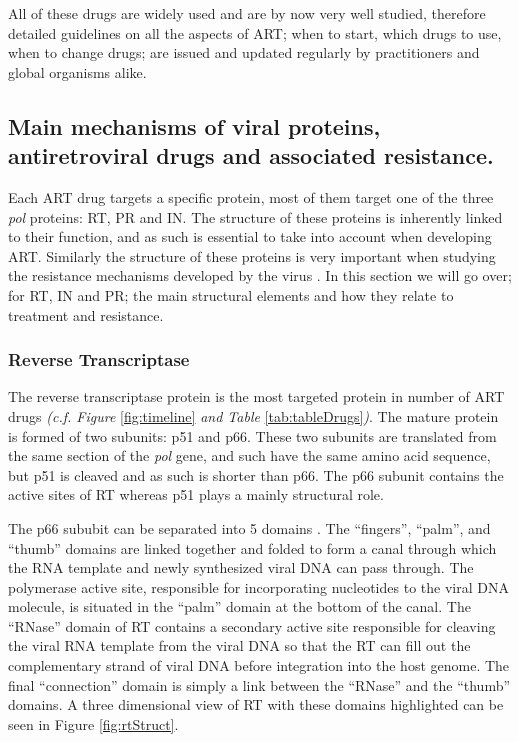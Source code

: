 \documentclass[
  11pt,
  twoside,
  BCOR=10mm,
  listof=totoc]{scrbook}
\begin{document}
All of these drugs are widely used and are by now very well studied, therefore detailed guidelines on all the aspects of ART; when to start, which drugs to use, when to change drugs; are issued and updated regularly by practitioners \autocite{zolopaEvolutionHIVTreatment2010} and global organisms \autocite{worldhealthorganizationConsolidatedGuidelinesHIV2021} alike.

\hypertarget{drug-mechanisms}{%
\subsection{Main mechanisms of viral proteins, antiretroviral drugs and associated resistance.}\label{drug-mechanisms}}

Each ART drug targets a specific protein, most of them target one of the three \emph{pol} proteins: RT, PR and IN. The structure of these proteins is inherently linked to their function, and as such is essential to take into account when developing ART. Similarly the structure of these proteins is very important when studying the resistance mechanisms developed by the virus \autocite{ammaranondMechanismHIVAntiretroviral2012,clavelHIVDrugResistance2004}. In this section we will go over; for RT, IN and PR; the main structural elements and how they relate to treatment and resistance.

\hypertarget{reverse-transcriptase}{%
\subsubsection{Reverse Transcriptase}\label{reverse-transcriptase}}

The reverse transcriptase protein is the most targeted protein in number of ART drugs \emph{(c.f. Figure} \ref{fig:timeline} \emph{and Table} \ref{tab:tableDrugs}\emph{)}. The mature protein is formed of two subunits: p51 and p66. These two subunits are translated from the same section of the \emph{pol} gene, and such have the same amino acid sequence, but p51 is cleaved and as such is shorter than p66. The p66 subunit contains the active sites of RT whereas p51 plays a mainly structural role.

The p66 sububit can be separated into 5 domains \autocite{sarafianosStructureFunctionHIV12009}. The ``fingers'', ``palm'', and ``thumb'' domains are linked together and folded to form a canal through which the RNA template and newly synthesized viral DNA can pass through. The polymerase active site, responsible for incorporating nucleotides to the viral DNA molecule, is situated in the ``palm'' domain at the bottom of the canal. The ``RNase'' domain of RT contains a secondary active site responsible for cleaving the viral RNA template from the viral DNA so that the RT can fill out the complementary strand of viral DNA before integration into the host genome. The final ``connection'' domain is simply a link between the ``RNase'' and the ``thumb'' domains. A three dimensional view of RT with these domains highlighted can be seen in Figure \ref{fig:rtStruct}.
\end{document}
